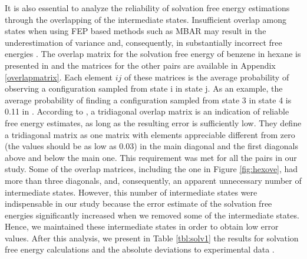 \FloatBarrier
It is also essential to analyze the reliability of solvation free energy estimations through the overlapping of the intermediate states. Insufficient overlap among states when using FEP based methods such as MBAR may result in the underestimation of variance and, consequently, in substantially incorrect free energies \cite{klimovich}. The overlap matrix for the solvation free energy of benzene in hexane is presented in  and the matrices for the other pairs are available in Appendix \ref{overlapmatrix}. Each element $ij$ of these matrices is the average probability of observing a configuration sampled from state i in state j. As an example, the average probability of finding a configuration sampled from state 3 in state 4 is 0.11 in . According to , a tridiagonal overlap matrix is an indication of reliable free energy estimates, as long as the resulting error is sufficiently low. They define a tridiagonal matrix as one matrix with elements appreciable different from zero (the values should be as low as 0.03) in the main diagonal and the first diagonals above and below the main one. This requirement was met for all the pairs in our study. Some of the overlap matrices, including the one in Figure \ref{fig:hexove}, had more than three diagonals, and, consequently, an apparent unnecessary number of intermediate states. However, this number of intermediate states were indispensable in our study because the error estimate of the solvation free energies significantly increased when we removed some of the intermediate states. Hence, we maintained these intermediate states in order to obtain low error values. After this analysis, we present in Table \ref{tbl:solv1} the results for solvation free energy calculations and the absolute deviations to experimental data \cite{doi:10.1021/ci034120c}.  

